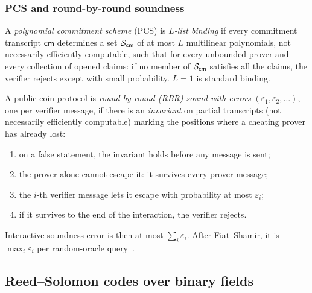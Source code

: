 \subsubsection{PCS and round-by-round soundness}\label{sec:iopcs}

\begin{definition}\label{def:listbinding}
A \emph{polynomial commitment scheme} (PCS) is \emph{$L$-list binding} if every commitment transcript $\mathsf{cm}$ determines a set $\mathcal{S}_{\mathsf{cm}}$ of at most $L$ multilinear polynomials, not necessarily efficiently computable, such that for every unbounded prover and every collection of opened claims: if no member of $\mathcal{S}_{\mathsf{cm}}$ satisfies all the claims, the verifier rejects except with small probability. $L = 1$ is standard binding.
\end{definition}

\begin{definition}\label{def:rbr}
A public-coin protocol is \emph{round-by-round (RBR) sound with errors} $(\varepsilon_1, \varepsilon_2, \dots)$, one per verifier message, if there is an \emph{invariant} on partial transcripts (not necessarily efficiently computable) marking the positions where a cheating prover has already lost:
\begin{enumerate}[itemsep=1pt,label=(\roman*)]
\item on a false statement, the invariant holds before any message is sent;
\item the prover alone cannot escape it: it survives every prover message;
\item the $i$-th verifier message lets it escape with probability at most $\varepsilon_i$;
\item if it survives to the end of the interaction, the verifier rejects.
\end{enumerate}
\end{definition}

Interactive soundness error is then at most $\sum_i \varepsilon_i$. After Fiat--Shamir, it is $\max_i \varepsilon_i$ per random-oracle query~\cite{CCHLRR19,BCS16}.

\subsection{Reed--Solomon codes over binary fields}\label{sec:binary-rs}

